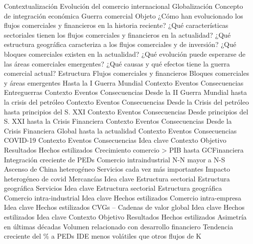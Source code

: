 \documentclass{nuevotema}
\begin{document}
\begin{esquema}[enumerate]
	\1[] 
		\2 Contextualización
			\3 Evolución del comercio internacional
			\3 Globalización
			\3 Concepto de integración económica
			\3 Guerra comercial
		\2 Objeto
			\3 ¿Cómo han evolucionado los flujos comerciales y financieros en la historia reciente?
			\3 ¿Qué características sectoriales tienen los flujos comerciales y financieros en la actualidad?
			\3 ¿Qué estructura geográfica caracteriza a los flujos comerciales y de inversión?
			\3 ¿Qué bloques comerciales existen en la actualidad?
			\3 ¿Qué evolución puede esperarse de las áreas comerciales emergentes?
			\3 ¿Qué causas y qué efectos tiene la guerra comercial actual?
		\2 Estructura
			\3 Flujos comerciales y financieros
			\3 Bloques comerciales y áreas emergentes
	\1 
		\2 Hasta la I Guerra Mundial
			\3 Contexto
			\3 Eventos
			\3 Consecuencias
		\2 Entreguerras
			\3 Contexto
			\3 Eventos
			\3 Consecuencias
		\2 Desde la II Guerra Mundial hasta la crisis del petróleo
			\3 Contexto
			\3 Eventos
			\3 Consecuencias
		\2 Desde la Crisis del petróleo hasta principios del S. XXI
			\3 Contexto
			\3 Eventos
			\3 Consecuencias
		\2 Desde principios del S. XXI hasta la Crisis Financiera
			\3 Contexto
			\3 Eventos
			\3 Consecuencias
		\2 Desde la Crisis Financiera Global hasta la actualidad
			\3 Contexto
			\3 Eventos
			\3 Consecuencias
		\2 COVID-19
			\3 Contexto
			\3 Eventos
			\3 Consecuencias
	\1 
		\2 Idea clave
			\3 Contexto
			\3 Objetivo
			\3 Resultados
		\2 Hechos estilizados
			\3[i] Crecimiento comercio > PIB hasta GCFinanciera
			\3[ii] Integración creciente de PEDs
			\3[iii] Comercio intraindustrial N-N mayor a N-S
			\3[iv] Ascenso de China heterogéneo
			\3[v] Servicios cada vez más importantes
			\3[vi] Impacto heterogéneo de covid
		\2 Mercancías
			\3 Idea clave
			\3 Estructura sectorial
			\3 Estructura geográfica
		\2 Servicios
			\3 Idea clave
			\3 Estructura sectorial
			\3 Estructura geográfica
		\2 Comercio intra-industrial
			\3 Idea clave
			\3 Hechos estilizados
		\2 Comercio intra-empresa
			\3 Idea clave
			\3 Hechos estilizados
		\2 CVGs -- Cadenas de valor global
			\3 Idea clave
			\3 Hechos estilizados
	\1 
		\2 Idea clave
			\3 Contexto
			\3 Objetivo
			\3 Resultados
		\2 Hechos estilizados
			\3[i] Asimetría en últimas décadas
			\3[ii] Volumen relacionado con desarrollo financiero
			\3[iii] Tendencia creciente del \% a PEDs
			\3[iv] IDE menos volátiles que otros flujos de K

\end{esquema}
\end{document}
